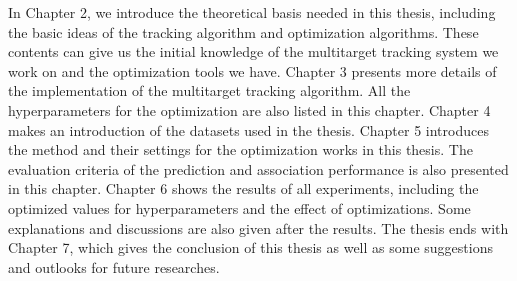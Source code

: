 In Chapter 2, we introduce the theoretical basis needed in this thesis, including the basic ideas of the tracking algorithm and optimization algorithms. These contents can give us the initial knowledge of the multitarget tracking system we work on and the optimization tools we have. Chapter 3 presents more details of the implementation of the multitarget tracking algorithm. All the hyperparameters for the optimization are also listed in this chapter. Chapter 4 makes an introduction of the datasets used in the thesis. Chapter 5 introduces the method and their settings for the optimization works in this thesis. The evaluation criteria of the prediction and association performance is also presented in this chapter. Chapter 6 shows the results of all experiments, including the optimized values for hyperparameters and the effect of optimizations. Some explanations and discussions are also given after the results. The thesis ends with Chapter 7, which gives the conclusion of this thesis as well as some suggestions and outlooks for future researches.








